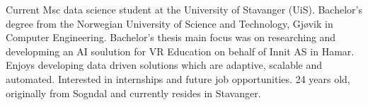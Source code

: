 

\begin{cvparagraph}

Current Msc data science student at the University of Stavanger (UiS). Bachelor's degree from the Norwegian University of Science and Technology, Gjøvik in Computer Engineering. Bachelor's thesis main focus was on researching and developming an AI soulution for VR Education on behalf of Innit AS in Hamar. Enjoys developing data driven solutions which are adaptive, scalable and automated. Interested in internships and future job opportunities. 24 years old, originally from Sogndal and currently resides in Stavanger.
\end{cvparagraph}
